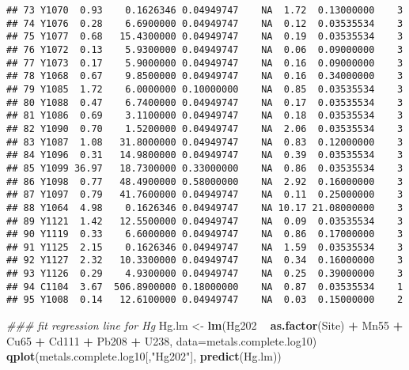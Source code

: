 \documentclass[]{article}
\newenvironment{Shaded}{\begin{snugshade}}{\end{snugshade}}
\newcommand{\CommentTok}[1]{\textcolor[rgb]{0.56,0.35,0.01}{\textit{#1}}}
\newcommand{\DataTypeTok}[1]{\textcolor[rgb]{0.13,0.29,0.53}{#1}}
\newcommand{\KeywordTok}[1]{\textcolor[rgb]{0.13,0.29,0.53}{\textbf{#1}}}
\newcommand{\NormalTok}[1]{#1}
\newcommand{\OperatorTok}[1]{\textcolor[rgb]{0.81,0.36,0.00}{\textbf{#1}}}
\newcommand{\StringTok}[1]{\textcolor[rgb]{0.31,0.60,0.02}{#1}}
\begin{document}
\begin{verbatim}
## 73 Y1070  0.93    0.1626346 0.04949747    NA  1.72  0.13000000    3
## 74 Y1076  0.28    6.6900000 0.04949747    NA  0.12  0.03535534    3
## 75 Y1077  0.68   15.4300000 0.04949747    NA  0.19  0.03535534    3
## 76 Y1072  0.13    5.9300000 0.04949747    NA  0.06  0.09000000    3
## 77 Y1073  0.17    5.9000000 0.04949747    NA  0.16  0.09000000    3
## 78 Y1068  0.67    9.8500000 0.04949747    NA  0.16  0.34000000    3
## 79 Y1085  1.72    6.0000000 0.10000000    NA  0.85  0.03535534    3
## 80 Y1088  0.47    6.7400000 0.04949747    NA  0.17  0.03535534    3
## 81 Y1086  0.69    3.1100000 0.04949747    NA  0.18  0.03535534    3
## 82 Y1090  0.70    1.5200000 0.04949747    NA  2.06  0.03535534    3
## 83 Y1087  1.08   31.8000000 0.04949747    NA  0.83  0.12000000    3
## 84 Y1096  0.31   14.9800000 0.04949747    NA  0.39  0.03535534    3
## 85 Y1099 36.97   18.7300000 0.33000000    NA  0.86  0.03535534    3
## 86 Y1098  0.77   48.4900000 0.58000000    NA  2.92  0.16000000    3
## 87 Y1097  0.79   41.7600000 0.04949747    NA  0.11  0.25000000    3
## 88 Y1064  4.98    0.1626346 0.04949747    NA 10.17 21.08000000    3
## 89 Y1121  1.42   12.5500000 0.04949747    NA  0.09  0.03535534    3
## 90 Y1119  0.33    6.6000000 0.04949747    NA  0.86  0.17000000    3
## 91 Y1125  2.15    0.1626346 0.04949747    NA  1.59  0.03535534    3
## 92 Y1127  2.32   10.3300000 0.04949747    NA  0.34  0.16000000    3
## 93 Y1126  0.29    4.9300000 0.04949747    NA  0.25  0.39000000    3
## 94 C1104  3.67  506.8900000 0.18000000    NA  0.87  0.03535534    1
## 95 Y1008  0.14   12.6100000 0.04949747    NA  0.03  0.15000000    2
\end{verbatim}

\begin{Shaded}
\begin{Highlighting}[]
\CommentTok{### fit regression line for Hg}
\NormalTok{Hg.lm <-}\StringTok{ }\KeywordTok{lm}\NormalTok{(Hg202 }\OperatorTok{~}\StringTok{ }\KeywordTok{as.factor}\NormalTok{(Site) }\OperatorTok{+}\StringTok{ }\NormalTok{Mn55 }\OperatorTok{+}\StringTok{ }\NormalTok{Cu65 }\OperatorTok{+}\StringTok{ }\NormalTok{Cd111 }\OperatorTok{+}\StringTok{ }\NormalTok{Pb208 }\OperatorTok{+}\StringTok{ }\NormalTok{U238,}
            \DataTypeTok{data=}\NormalTok{metals.complete.log10) }
\KeywordTok{qplot}\NormalTok{(metals.complete.log10[,}\StringTok{"Hg202"}\NormalTok{], }\KeywordTok{predict}\NormalTok{(Hg.lm))}
\end{Highlighting}
\end{Shaded}
\end{document}
